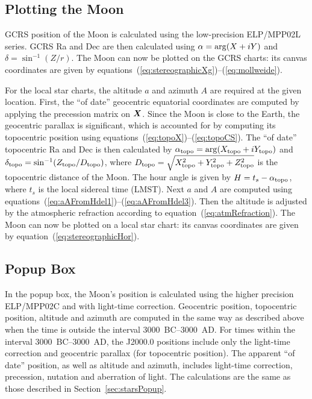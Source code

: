 \documentclass[12pt]{article}
\newcommand{\ve}[1]{\mbox{\boldmath $#1$}}
\begin{document}
\subsection{Plotting the Moon} 

GCRS position of the Moon is calculated using the low-precision ELP/MPP02L 
series. GCRS Ra and Dec are then calculated using $\alpha={\rm arg}(X+iY)$ 
and $\delta=\sin^{-1}(Z/r)$. The Moon can now be plotted 
on the GCRS charts: its canvas coordinates are given by 
equations~(\ref{eq:stereographicXg})--(\ref{eq:mollweide}).

For the local star charts, the altitude $a$
and azimuth $A$ are required at the given location. First, the ``of date'' geocentric equatorial
coordinates are computed by applying the precession matrix on $\ve{X}$. 
Since the Moon is close to the Earth, the geocentric parallax is significant, which 
is accounted for by computing its topocentric position using 
equations~(\ref{eq:topoX})--(\ref{eq:topoCS}). The ``of date'' topocentric Ra and Dec
is then calculated by $\alpha_{\rm topo} = {\rm arg}(X_{\rm topo}+iY_{\rm topo})$ and 
$\delta_{\rm topo}=\sin^{-1} (Z_{\rm topo}/D_{\rm topo})$, where 
$D_{\rm topo}=\sqrt{X_{\rm topo}^2 + Y_{\rm topo}^2 + Z_{\rm topo}^2}$ is 
the topocentric distance of the Moon.
The hour angle is given by $H=t_s-\alpha_{\rm topo}$, where $t_s$ is the local
sidereal time (LMST). Next $a$ and $A$ are computed using
equations~(\ref{eq:aAFromHdel1})--(\ref{eq:aAFromHdel3}). Then the altitude
is adjusted by the atmospheric refraction according to equation~(\ref{eq:atmRefraction}).
The Moon can now be plotted on a local star chart: its canvas coordinates are
given by equation~(\ref{eq:stereographicHor}).

\subsection{Popup Box}

In the popup box, the Moon's position is calculated using the higher precision 
ELP/MPP02C and with light-time correction. Geocentric position, topocentric 
position, altitude and azimuth are computed in the same way as described above when 
the time is outside the interval 3000~BC--3000~AD. For times within the interval 
3000~BC--3000~AD, the J2000.0 positions
include only the light-time correction and geocentric parallax (for topocentric
position). The apparent ``of date'' position, as well as altitude and azimuth,
includes light-time correction,
precession, nutation and aberration of light. The calculations are the same
as those described in Section~\ref{sec:starsPopup}.
\end{document}
